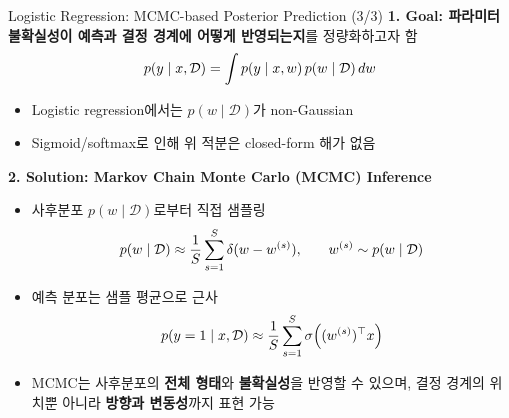 \documentclass[xcolor=dvipsnames,t,9pt]{beamer}
\begin{document}
\begin{frame}{Logistic Regression: MCMC-based Posterior Prediction (3/3)}
    \textbf{1. Goal: 파라미터 불확실성이 예측과 결정 경계에 어떻게 반영되는지}를 정량화하고자 함
    $$ \small
    p(y \mid x, \mathcal{D})
    = \int p(y \mid x, w)\, p(w \mid \mathcal{D}) \, dw
    $$ \vspace{-1em}
    \begin{itemize}
        \item Logistic regression에서는 $p(w\mid\mathcal{D})$가 non-Gaussian
        \item Sigmoid/softmax로 인해 위 적분은 closed-form 해가 없음
    \end{itemize}
    \vspace{1em}
    \textbf{2. Solution: Markov Chain Monte Carlo (MCMC) Inference}
    \begin{itemize}
        \item 사후분포 $p(w\mid\mathcal{D})$로부터 직접 샘플링
        \[ \small
        p(w\mid\mathcal{D})
        \approx \frac{1}{S}\sum_{s=1}^{S}\delta(w-w^{(s)}),
        \qquad w^{(s)} \sim p(w\mid\mathcal{D})
        \]
        \item 예측 분포는 샘플 평균으로 근사
        \[ \small
        p(y=1\mid x,\mathcal{D})
        \approx \frac{1}{S}\sum_{s=1}^{S}
        \sigma\!\left((w^{(s)})^\top x\right)
        \]
        \item MCMC는 사후분포의 \textbf{전체 형태}와 \textbf{불확실성}을 반영할 수 있으며, 결정 경계의 위치뿐 아니라 \textbf{방향과 변동성}까지 표현 가능
    \end{itemize}
\end{frame}

\end{document}
